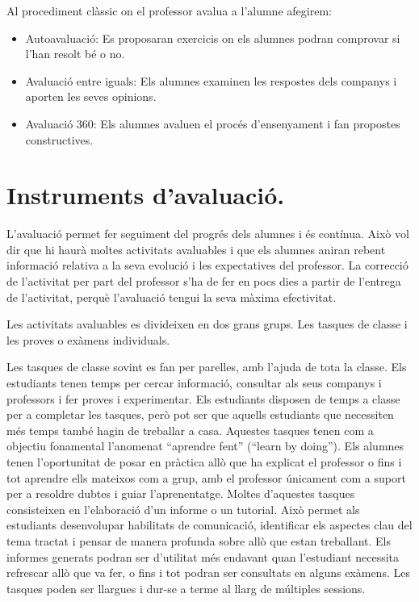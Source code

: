\documentclass[catalan, a4paper, 12pt, titlepage]{article}
\begin{document}
Al procediment clàssic on el professor avalua a l'alumne afegirem:

\begin{itemize}
	\item Autoavaluació: Es proposaran exercicis on els alumnes podran comprovar si l'han resolt bé o no.
	\item Avaluació entre iguals: Els alumnes examinen les respostes dels companys i aporten les seves opinions.
	\item Avaluació 360: Els alumnes avaluen el procés d'ensenyament i fan propostes constructives.
\end{itemize}

\section{Instruments d'avaluació.}
\label{sec:instruments}

L'avaluació permet fer seguiment del progrés dels alumnes i és contínua.
Això vol dir que hi haurà moltes activitats avaluables i que els alumnes aniran rebent informació relativa a la seva evolució i les expectatives del professor.
La correcció de l'activitat per part del professor s'ha de fer en pocs dies a partir de l'entrega de l'activitat, perquè l'avaluació tengui la seva màxima efectivitat.

Les activitats avaluables es divideixen en dos grans grups. 
Les tasques de classe i les proves o exàmens individuals.

Les tasques de classe sovint es fan per parelles, amb l'ajuda de tota la classe.
Els estudiants tenen temps per cercar informació, consultar als seus companys i professors i fer proves i experimentar. 
Els estudiants disposen de temps a classe per a completar les tasques, però pot ser que aquells estudiants que necessiten més temps també hagin de treballar a casa.
Aquestes tasques tenen com a objectiu fonamental l'anomenat ``aprendre fent'' (``learn by doing'').
Els alumnes tenen l'oportunitat de posar en pràctica allò que ha explicat el professor o fins i tot aprendre ells mateixos com a grup, amb el professor únicament com a suport per a resoldre dubtes i guiar l'aprenentatge.
Moltes d'aquestes tasques consisteixen en l'elaboració d'un informe o un tutorial.
Això permet als estudiants desenvolupar habilitats de comunicació, identificar els aspectes clau del tema tractat i pensar de manera profunda sobre allò que estan treballant. Els informes generats podran ser d'utilitat més endavant quan l'estudiant necessita refrescar allò que va fer, o fins i tot podran ser consultats en alguns exàmens.
Les tasques poden ser llargues i dur-se a terme al llarg de múltiples sessions.
\end{document}
